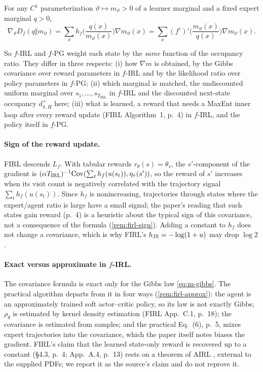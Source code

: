 \begin{proposition}\label{prop:m-firl-fpg}
For any $C^1$ parameterization $\vartheta\mapsto m_\vartheta>0$ of a learner marginal and a fixed expert marginal $q>0$,
\[
\nabla_\vartheta D_f(q\Vert m_\vartheta)=\sum_xh_f\Big(\frac{q(x)}{m_\vartheta(x)}\Big)\nabla m_\vartheta(x)=\sum_x(f^\circ)'\Big(\frac{m_\vartheta(x)}{q(x)}\Big)\nabla m_\vartheta(x).
\]
\end{proposition}

So $f$-IRL and $f$-PG weight each state by the \emph{same} function of the occupancy ratio. They differ in three respects:
(i) how $\nabla m$ is obtained, by the Gibbs covariance over reward parameters in $f$-IRL and by the likelihood ratio over policy parameters in $f$-PG;
(ii) which marginal is matched, the undiscounted uniform marginal over $s_1,\dots,s_{T_{\mathrm{IRL}}}$ in $f$-IRL and the discounted next-state occupancy $d^+_{\pi,H}$ here;
(iii) what is learned, a reward that needs a MaxEnt inner loop after every reward update (FIRL Algorithm~1, p.~4) in $f$-IRL, and the policy itself in $f$-PG.

\paragraph{Sign of the reward update.}
FIRL descends $L_f$. With tabular rewards $r_\theta(s)=\theta_s$, the $s'$-component of the gradient is $(\alpha T_{\mathrm{IRL}})^{-1}\mathrm{Cov}(\sum_th_f(u(s_t)),\eta_\tau(s'))$, so the reward of $s'$ increases when its visit count is negatively correlated with the trajectory signal $\sum_th_f(u(s_t))$. Since $h_f$ is nonincreasing, trajectories through states where the expert/agent ratio is large have a small signal; the paper's reading that such states gain reward (p.~4) is a heuristic about the typical sign of this covariance, not a consequence of the formula (\cref{rem:firl-sign}). Adding a constant to $h_f$ does not change a covariance, which is why FIRL's $h_{\mathrm{JS}}=-\log(1+u)$ may drop $\log2$ .

\paragraph{Exact versus approximate in $f$-IRL.}
The covariance formula is exact only for the Gibbs law \eqref{eq:m-gibbs}. The practical algorithm departs from it in four ways (\cref{rem:firl-approx}): the agent is an approximately trained soft actor--critic policy, so its law is not exactly Gibbs; $\rho_\theta$ is estimated by kernel density estimation (FIRL App.~C.1, p.~18); the covariance is estimated from samples; and the practical Eq.~(6), p.~5, mixes expert trajectories into the covariance, which the paper itself notes biases the gradient.
FIRL's claim that the learned state-only reward is recovered up to a constant (\S4.3, p.~4; App.~A.4, p.~13) rests on a theorem of AIRL \citep{fu2018airl}, external to the supplied PDFs; we report it as the source's claim and do not reprove it.
